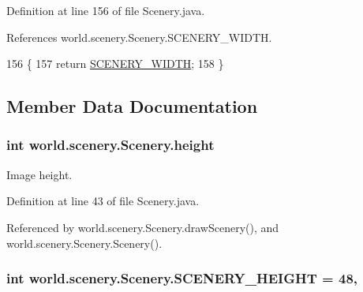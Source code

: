 Definition at line 156 of file Scenery.\-java.



References world.\-scenery.\-Scenery.\-S\-C\-E\-N\-E\-R\-Y\-\_\-\-W\-I\-D\-T\-H.


\begin{DoxyCode}
156                                         \{
157         \textcolor{keywordflow}{return} \hyperlink{classworld_1_1scenery_1_1_scenery_affb047c028883c6d069a03ef0f1caeb8}{SCENERY\_WIDTH};
158     \}
\end{DoxyCode}


\subsection{Member Data Documentation}
\hypertarget{classworld_1_1scenery_1_1_scenery_a54b4edfa060087e78a829105bf62a900}{
\subsubsection[{height}]{\setlength{\rightskip}{0pt plus 5cm}int world.\-scenery.\-Scenery.\-height\hspace{0.3cm}{\ttfamily [protected]}}}\label{classworld_1_1scenery_1_1_scenery_a54b4edfa060087e78a829105bf62a900}


Image height. 



Definition at line 43 of file Scenery.\-java.



Referenced by world.\-scenery.\-Scenery.\-draw\-Scenery(), and world.\-scenery.\-Scenery.\-Scenery().

\hypertarget{classworld_1_1scenery_1_1_scenery_a106e53ae6e1647395740237ccce7f363}{
\subsubsection[{S\-C\-E\-N\-E\-R\-Y\-\_\-\-H\-E\-I\-G\-H\-T}]{\setlength{\rightskip}{0pt plus 5cm}int world.\-scenery.\-Scenery.\-S\-C\-E\-N\-E\-R\-Y\-\_\-\-H\-E\-I\-G\-H\-T = 48\hspace{0.3cm}{\ttfamily [static]}, {\ttfamily [protected]}}}\label{classworld_1_1scenery_1_1_scenery_a106e53ae6e1647395740237ccce7f363}


